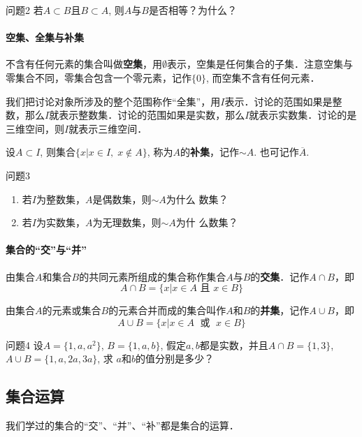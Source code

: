 \begin{blk}{问题2}
    若$A\subset B$且$B\subset A$, 则$A$与$B$是否相等？为什么？
\end{blk}

\paragraph{空集、全集与补集}

不含有任何元素的集合叫做\textbf{空集}，用$\emptyset$表示，空集是任何集合的子集．注意空集与零集合不同，零集合包含一个零元素，记作$\{0\}$, 而空集不含有任何元素．

我们把讨论对象所涉及的整个范围称作“全集”，用$I$表示．讨论的范围如果是整数，那么$I$就表示整数集．讨论的范围如果是实数，那么$I$就表示实数集．讨论的是三维空间，则$I$就表示三维空间．

设$A\subset I$, 则集合$\{x|x\in I,\; x\notin A\}$, 称为$A$的\textbf{补集}，记作$\sim A$. 也可记作$\overline{A}$.

\begin{blk}{问题3}
\begin{enumerate}
    \item 若$I$为整数集，$A$是偶数集，则$\sim A$为什么
数集？
\item 若$I$为实数集，$A$为无理数集，则$\sim A$为什
么数集？
\end{enumerate}
\end{blk}

\paragraph{集合的“交”与“并”}

由集合$A$和集合$B$的共同元素所组成的集合称作集合$A$与$B$的\textbf{交集}．记作$A\cap B$，即
\[A\cap B=\{x|x\in A\text{ 且 }x\in B\}\]

由集合$A$的元素或集合$B$的元素合并而成的集合叫作$A$和$B$的\textbf{并集}，记作$A\cup B$，即
\[A\cup B=\{x|x\in A\; \text{ 或 }\; x\in B\}\]

\begin{blk}{问题4}
    设$A=\{1,a,a^2\}$, $B=\{1,a,b\}$, 假定$a,b$都是实数，并且$A\cap B=\{1, 3\}$, $A\cup B=\{1,a,2a,3a\}$, 求
$a$和$b$的值分别是多少？
\end{blk}


\subsection{集合运算}

我们学过的集合的“交”、“并”、“补”都是集合的运算．


